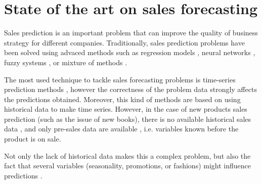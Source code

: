 \documentclass[a4paper,10pt,onecolumn,preprint,3p]{elsarticle}
\begin{document}
\section{State of the art on sales forecasting} 
\label{sec:soa}

Sales prediction is an important problem that can improve the quality of business 
strategy for different companies. 
Traditionally, sales prediction problems have been solved using advaced methods 
such as regression models \cite{Papalexopoulos1990}, neural networks \cite{Yoo1999}, 
fuzzy systems \cite{Mastorocostas2001}, or mixture of methods \cite{Chang2006715,Meulstee2008,ChiJie2012}.

The most used technique to tackle sales forecasting problems is time-series prediction methods
\cite{Chu2003,Brown1959,Winters1960,Box1969,Papalexopoulos1990,KayacanUK10},
however the correctness of the problem data strongly affects the predictions obtained.
Moreover, this kind of methods are based on using historical data to make time series.
However, in the case of new products sales prediction (such as the issue of new books), 
there is no available historical sales data \cite{ChingChin2010}, 
and only pre-sales data are available \cite{FaderHardie2005,Madsen2008}, 
i.e. variables known before the product is on sale.

Not only the lack of historical data makes this a complex problem, but also the fact 
that several variables (seasonality, promotions, or fashions) might influence predictions
\cite{Lapide1999,Thomassey2012,Xia2012,SThomassey2014,ChernWSF15}.
\end{document}

